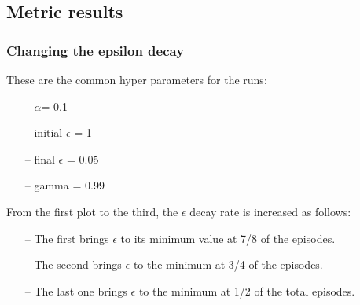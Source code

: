 \documentclass{article}
\begin{document}
\subsection{Metric results}

\subsubsection{Changing the epsilon decay}

These are the common hyper parameters for the runs:
\begin{itemize}
\item[--] $\alpha$= 0.1
\item[--] initial $\epsilon$ = 1
\item[--] final $\epsilon$ = 0.05
\item[--] gamma = 0.99
\end{itemize}

From the first plot to the third, the $\epsilon$ decay rate is increased as follows:
\begin{itemize}
\item[--] The first brings $\epsilon$ to its minimum value at 7/8 of the episodes.
\item[--] The second brings $\epsilon$ to the minimum at 3/4 of the episodes.
\item[--] The last one brings $\epsilon$ to the minimum at 1/2 of the total episodes.
\end{itemize}

\begin{center}
\centering
{}
\end{center}


\begin{center}
\centering
{}
\end{center}
\end{document}
